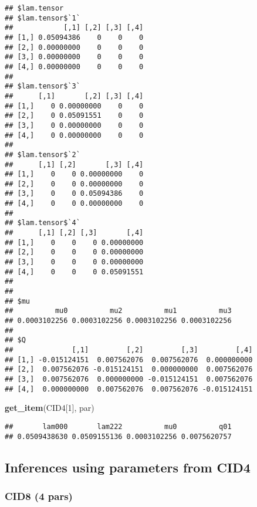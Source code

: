\documentclass[
]{article}
\newenvironment{Shaded}{\begin{snugshade}}{\end{snugshade}}
\newcommand{\DecValTok}[1]{\textcolor[rgb]{0.00,0.00,0.81}{#1}}
\newcommand{\FunctionTok}[1]{\textcolor[rgb]{0.13,0.29,0.53}{\textbf{#1}}}
\newcommand{\NormalTok}[1]{#1}
\newcommand{\StringTok}[1]{\textcolor[rgb]{0.31,0.60,0.02}{#1}}
\begin{document}
\begin{verbatim}
## $lam.tensor
## $lam.tensor$`1`
##            [,1] [,2] [,3] [,4]
## [1,] 0.05094386    0    0    0
## [2,] 0.00000000    0    0    0
## [3,] 0.00000000    0    0    0
## [4,] 0.00000000    0    0    0
## 
## $lam.tensor$`3`
##      [,1]       [,2] [,3] [,4]
## [1,]    0 0.00000000    0    0
## [2,]    0 0.05091551    0    0
## [3,]    0 0.00000000    0    0
## [4,]    0 0.00000000    0    0
## 
## $lam.tensor$`2`
##      [,1] [,2]       [,3] [,4]
## [1,]    0    0 0.00000000    0
## [2,]    0    0 0.00000000    0
## [3,]    0    0 0.05094386    0
## [4,]    0    0 0.00000000    0
## 
## $lam.tensor$`4`
##      [,1] [,2] [,3]       [,4]
## [1,]    0    0    0 0.00000000
## [2,]    0    0    0 0.00000000
## [3,]    0    0    0 0.00000000
## [4,]    0    0    0 0.05091551
## 
## 
## $mu
##          mu0          mu2          mu1          mu3 
## 0.0003102256 0.0003102256 0.0003102256 0.0003102256 
## 
## $Q
##              [,1]         [,2]         [,3]         [,4]
## [1,] -0.015124151  0.007562076  0.007562076  0.000000000
## [2,]  0.007562076 -0.015124151  0.000000000  0.007562076
## [3,]  0.007562076  0.000000000 -0.015124151  0.007562076
## [4,]  0.000000000  0.007562076  0.007562076 -0.015124151
\end{verbatim}

\begin{Shaded}
\begin{Highlighting}[]
\FunctionTok{get\_item}\NormalTok{(CID4[}\DecValTok{1}\NormalTok{], }\StringTok{\textquotesingle{}par\textquotesingle{}}\NormalTok{)}
\end{Highlighting}
\end{Shaded}

\begin{verbatim}
##       lam000       lam222          mu0          q01 
## 0.0509438630 0.0509155136 0.0003102256 0.0075620757
\end{verbatim}

\hypertarget{inferences-using-parameters-from-cid4}{%
\subsection{Inferences using parameters from CID4}\label{inferences-using-parameters-from-cid4}}

\hypertarget{cid8-4-pars}{%
\subsubsection{CID8 (4 pars)}\label{cid8-4-pars}}
\end{document}
